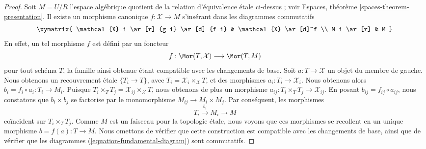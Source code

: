 \begin{proof}
\medskip\noindent
Soit $M = U/R$ l'espace algébrique quotient de la
relation d'équivalence \'etale ci-dessus ; voir
Espaces, théorème \ref{spaces-theorem-presentation}.
Il existe un morphisme canonique $f : \mathcal{X} \to M$
s'insérant dans les diagrammes commutatifs
\begin{equation}
\label{equation-fundamental-diagram}
\xymatrix{
\mathcal{X}_i \ar[r]_{g_i} \ar[d]_{f_i} & \mathcal{X} \ar[d]^f \\
M_i \ar[r] & M
}
\end{equation}
En effet, un tel morphisme $f$ est défini par un foncteur
$$
f : \Mor(T, \mathcal{X}) \longrightarrow \Mor(T, M)
$$
pour tout schéma $T$, la famille ainsi obtenue étant compatible avec les changements de base. Soit $a : T \to \mathcal{X}$
un objet du membre de gauche. Nous obtenons un recouvrement \'etale
$\{T_i \to T\}$, avec $T_i = \mathcal{X}_i \times_\mathcal{X} T$,
et des morphismes $a_i : T_i \to \mathcal{X}_i$. Nous obtenons alors
$b_i = f_i \circ a_i : T_i \to M_i$. Puisque
$T_i \times_T T_j = \mathcal{X}_{ij} \times_\mathcal{X} T$,
nous obtenons de plus un morphisme $a_{ij} : T_i \times_T T_j \to \mathcal{X}_{ij}$.
En posant $b_{ij} = f_{ij} \circ a_{ij}$, nous constatons que
$b_i \times b_j$ se factorise par le monomorphisme
$M_{ij} \to M_i \times M_j$. Par conséquent, les morphismes
$$
T_i \xrightarrow{b_i} M_i \to M
$$
coïncident sur $T_i \times_T T_j$. Comme $M$ est un faisceau pour la
topologie \'etale, nous voyons que ces morphismes se recollent en un unique
morphisme $b = f(a) : T \to M$. Nous omettons de vérifier que
cette construction est compatible avec les changements de base, ainsi que de vérifier
que les diagrammes
(\ref{equation-fundamental-diagram}) sont commutatifs.


\end{proof}

